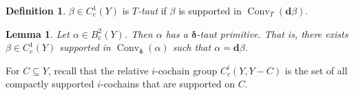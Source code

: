 \documentclass{amsart}
\numberwithin{equation}{section}
\newtheorem{lemma}[theorem]{Lemma}
\theoremstyle{definition}
\newtheorem{definition}[theorem]{Definition}
\newcommand{\bfd}{\mathbf{d}}
\newcommand{\bdelta}{{\boldsymbol\delta}}
\DeclareMathOperator{\conv}{Conv}
\begin{document}

\begin{definition}
    $\beta\in C^1_c(Y)$ is \emph{$T$-taut} if $\beta$ is supported in $\conv_T(\bfd \beta)$.
\end{definition}

\begin{lemma}\label{lem: primitive in convex hull}
    Let $\alpha\in B^2_c(Y)$. Then $\alpha$ has a $\bdelta$-taut primitive. That is, there exists $\beta\in C^1_c(Y)$ supported in $\conv_\bdelta(\alpha)$ such that $\alpha = \bfd \beta$. 
\end{lemma}

For $C\subseteq Y$, recall that the relative $i$-cochain group $C^i_c(Y,Y -C)$ is the set of all compactly supported $i$-cochains that are supported on $C$.
\end{document}
